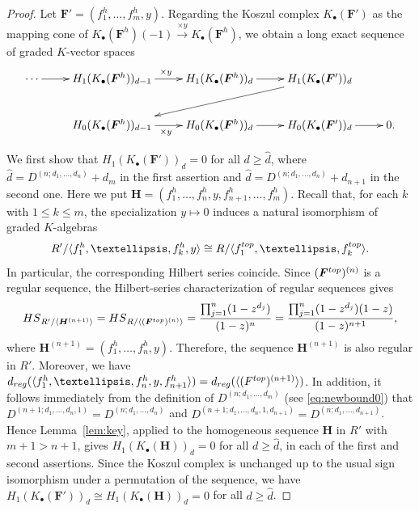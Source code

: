 \documentclass{article}
\theoremstyle{definition}
\theoremstyle{plain}
\theoremstyle{plain}
\theoremstyle{plain}
\theoremstyle{plain}
\numberwithin{equation}{subsection}
\begin{document}
\begin{proof}
Let $\bm{F}'=(f_1^h,\dots,f_m^h,y)$.
Regarding the Koszul complex $K_{\bullet}(\bm{F}')$ as the mapping cone of $K_{\bullet}(\bm{F}^h)(-1)\xrightarrow{\times y}K_{\bullet}(\bm{F}^h)$, we obtain a long exact sequence of graded $K$-vector spaces
\begin{equation}
\xymatrix{
\cdots \ar[r] &
H_1(K_{\bullet}(\bm{F}^h))_{d-1}
\ar[r]^{\times y} &
H_1(K_{\bullet}(\bm{F}^h))_{d}
\ar[r] &
H_1(K_{\bullet}(\bm{F}'))_{d}
\ar[dll]  \\
&
H_0(K_{\bullet}(\bm{F}^h))_{d-1}
\ar[r]_{\times y} &
H_0(K_{\bullet}(\bm{F}^h))_{d}
\ar[r] &
H_0(K_{\bullet}(\bm{F}'))_{d}
\ar[r] & 0 .
}
\label{eq:longexactseq}
\end{equation}

We first show that $H_1(K_\bullet(\bm F'))_d=0$ for all $d\ge \hat d$, where $\hat d=D^{(n;d_1,\ldots,d_n)}+d_m$ in the first assertion and $\hat d=D^{(n;d_1,\ldots,d_n)}+d_{n+1}$ in the second one.
Here we put $\bm H=(f_1^h,\ldots,f_n^h,y,f_{n+1}^h,\ldots,f_m^h)$.
Recall that, for each $k$ with $1\leq k \leq m$, the specialization $y\mapsto 0$ induces a natural isomorphism of graded $K$-algebras
\begin{equation}\label{eq:key_isom}
    R'/\langle f_1^h,\ldots,f_k^h,y\rangle \cong R/\langle f_1^{\rm top},\ldots,f_k^{\rm top}\rangle.
\end{equation}
In particular, the corresponding Hilbert series coincide.
Since $(\bm F^{\rm top})^{(n)}$ is a regular sequence, the Hilbert-series characterization of regular sequences \cite[Proposition~1.7.4]{Bar} gives
\[
{\rm HS}_{R'/\langle \bm{H}^{(n+1)}\rangle}
={\rm HS}_{R/\langle (\bm{F}^{\rm top})^{(n)} \rangle}
=\frac{\prod_{j=1}^n (1-z^{d_j})}{(1-z)^n}
=\frac{\prod_{j=1}^n (1-z^{d_j})(1-z)}{(1-z)^{n+1}}, 
\]
where $\bm H^{(n+1)}=(f_1^h,\ldots,f_n^h,y)$. 
Therefore, the sequence $\bm{H}^{(n+1)}$ is also regular in $R'$. 
Moreover, we have $d_{\rm reg}(\langle f_1^h,\ldots,f_n^h,y,f_{n+1}^h\rangle) =d_{\rm reg}(\langle(F^{\rm top})^{(n+1)}\rangle)$.
In addition, it follows immediately from the definition of $D^{(n;d_1,\ldots,d_m)}$ (see \eqref{eq:newbound0}) that $D^{(n+1;d_1,\ldots,d_n,1)}=D^{(n;d_1,\ldots,d_n)}$ and $D^{(n+1;d_1,\ldots,d_n,1,d_{n+1})}=D^{(n;d_1,\ldots,d_{n+1})}$.
Hence Lemma~\ref{lem:key}, applied to the homogeneous sequence $\bm H$ in $R'$ with $m+1 > n+1$, gives $H_1(K_\bullet(\bm H))_d=0$ for all $d\ge \hat d$, in each of the first and second assertions.
Since the Koszul complex is unchanged up to the usual sign isomorphism under a permutation of the sequence, we have $H_1(K_\bullet(\bm F'))_d\cong H_1(K_\bullet(\bm H))_d=0$ for all $d\ge \hat d$.


\end{proof}
\end{document}
